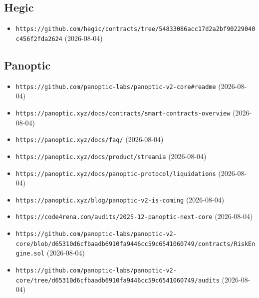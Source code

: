 \subsection*{Hegic}
\begin{itemize}\setlength{\itemsep}{0pt}\small
\item \texttt{https://github.com/hegic/contracts/tree/54833086acc17d2a2bf90229040c456f2fda2624} (2026-08-04)
\end{itemize}

\subsection*{Panoptic}
\begin{itemize}\setlength{\itemsep}{0pt}\small
\item \texttt{https://github.com/panoptic-labs/panoptic-v2-core\#readme} (2026-08-04)
\item \texttt{https://panoptic.xyz/docs/contracts/smart-contracts-overview} (2026-08-04)
\item \texttt{https://panoptic.xyz/docs/faq/} (2026-08-04)
\item \texttt{https://panoptic.xyz/docs/product/streamia} (2026-08-04)
\item \texttt{https://panoptic.xyz/docs/panoptic-protocol/liquidations} (2026-08-04)
\item \texttt{https://panoptic.xyz/blog/panoptic-v2-is-coming} (2026-08-04)
\item \texttt{https://code4rena.com/audits/2025-12-panoptic-next-core} (2026-08-04)
\item \texttt{https://github.com/panoptic-labs/panoptic-v2-core/blob/d65310d6cfbaadb6910fa9446cc59c6541060749/contracts/RiskEngine.sol} (2026-08-04)
\item \texttt{https://github.com/panoptic-labs/panoptic-v2-core/tree/d65310d6cfbaadb6910fa9446cc59c6541060749/audits} (2026-08-04)
\end{itemize}

